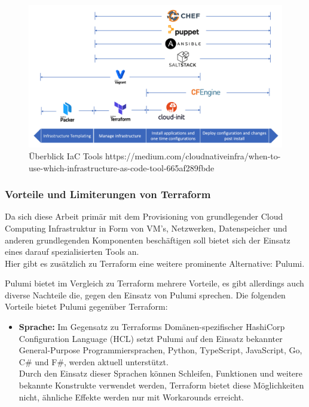 \begin{spacing}{1.2}
\begin{figure}[H]
  \includegraphics[width=1.0\textwidth]{fig/hauptteil/IaC_Tools.png}
  \caption{Überblick IaC Tools https://medium.com/cloudnativeinfra/when-to-use-which-infrastructure-as-code-tool-665af289fbde}
  \centering
\end{figure}

\subsubsection{Vorteile und Limiterungen von Terraform}

Da sich diese Arbeit primär mit dem Provisioning von grundlegender Cloud
Computing Infrastruktur in Form von VM's, Netzwerken, Datenspeicher und
anderen grundlegenden Komponenten beschäftigen soll bietet sich der Einsatz
eines darauf spezialisierten Tools an.\\
Hier gibt es zusätzlich zu Terraform eine weitere prominente Alternative:
Pulumi.

Pulumi bietet im Vergleich zu Terraform mehrere Vorteile, es gibt allerdings
auch diverse Nachteile die, gegen den Einsatz von
Pulumi sprechen. Die folgenden Vorteile bietet Pulumi gegenüber Terraform:

\begin{itemize}
  \item \textbf{Sprache:} Im Gegensatz zu Terraforms Domänen-spezifischer
  HashiCorp Configuration Language (HCL) setzt Pulumi auf den Einsatz
  bekannter General-Purpose Programmiersprachen, Python, TypeScript,
  JavaScript, Go, C\# und F\#, werden aktuell unterstützt.\\
  Durch den Einsatz dieser Sprachen können Schleifen, Funktionen und
  weitere bekannte Konstrukte verwendet werden, Terraform bietet diese
  Möglichkeiten nicht, ähnliche Effekte werden nur mit Workarounds erreicht.


\end{itemize}
\end{spacing}
